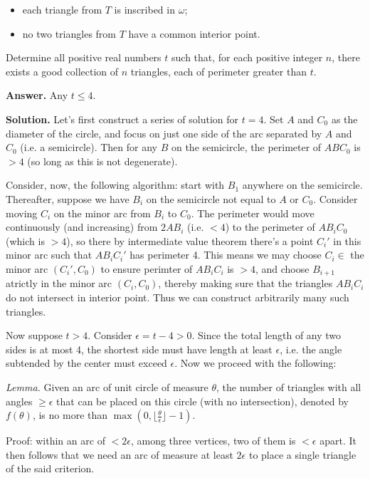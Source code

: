 \documentclass[11pt,a4paper]{article}
\begin{document}
\begin{enumerate}
	\begin{itemize}
		\item each triangle from $T$ is inscribed in $\omega$;
		
		\item no two triangles from $T$ have a common interior point.
	\end{itemize}
	Determine all positive real numbers $t$ such that, for each positive integer $n$, there exists a good collection of $n$ triangles, each of perimeter greater than $t$.
	
	\textbf{Answer.} Any $t\le 4$. 
	
	\textbf{Solution.} 
	Let's first construct a series of solution for $t=4$. 
	Set $A$ and $C_0$ as the diameter of the circle, and focus on just one side of the arc separated by $A$ and $C_0$ (i.e. a semicircle). 
	Then for any $B$ on the semicircle, the perimeter of $ABC_0$ is $>4$ (so long as this is not degenerate). 
	
	Consider, now, the following algorithm: start with $B_1$ anywhere on the semicircle. 
	Thereafter, suppose we have $B_i$ on the semicircle not equal to $A$ or $C_0$. Consider moving $C_i$ on the minor arc from $B_i$ to $C_0$. 
	The perimeter would move continuously (and increasing) 
	from $2AB_i$ (i.e. $<4$) to the perimeter of $AB_iC_0$ (which is $>4$), 
	so there by intermediate value theorem there's a point $C_i'$ in this minor arc such that $AB_iC_i'$ has perimeter 4. 
	This means we may choose $C_i\in$ the minor arc $(C_i', C_0)$ to ensure perimter of $AB_iC_i$ is $>4$, 
	and choose $B_{i+1}$ atrictly in the minor arc $(C_i, C_0)$, 
	thereby making sure that the triangles $AB_iC_i$ do not intersect in interior point. 
	Thus we can construct arbitrarily many such triangles. 
	
	Now suppose $t>4$. Consider $\epsilon=t - 4>0$. Since the total length of any two sides is at most 4, the shortest side must have length at least $\epsilon$, i.e. the angle subtended by the center must exceed $\epsilon$. Now we proceed with the following: 
	
	\emph{Lemma.} Given an arc of unit circle of measure $\theta$, the number of triangles with all angles $\ge \epsilon$ that can be placed on this circle (with no intersection), denoted by $f(\theta)$, is no more than $\max(0, \lfloor \frac{\theta}{\epsilon}\rfloor - 1)$. 
	
	Proof: within an arc of $<2\epsilon$, among three vertices, two of them is $<\epsilon$ apart. 
	It then follows that we need an arc of measure at least $2\epsilon$ to place a single triangle of the said criterion. 
	

\end{enumerate}
\end{document}
